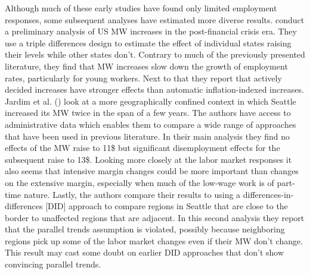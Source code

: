 \documentclass[11pt]{scrartcl}
\begin{document}
Although much of these early studies have found only limited employment responses, some subsequent analyses have estimated more diverse results. \textcite{StrainMW2017} conduct a preliminary analysis of US MW increases in the post-financial crisis era. They use a triple differences design to estimate the effect of individual states raising their levels while other states don't. Contrary to much of the previously presented literature, they find that MW increases slow down the growth of employment rates, particularly for young workers. Next to that they report that actively decided increases have stronger effects than automatic inflation-indexed increases. Jardim et al. (\citeyear{JardimMWSeattle2017}) look at a more geographically confined context in which Seattle increased its MW twice in the span of a few years. The authors have access to administrative data which enables them to compare a wide range of approaches that have been used in previous literature. In their main analysis they find no effects of the MW raise to 11\$ but significant disemployment effects for the subsequent raise to 13\$. Looking more closely at the labor market responses it also seems that intensive margin changes could be more important than changes on the extensive margin, especially when much of the low-wage work is of part-time nature. Lastly, the authors compare their results to using a differences-in-differences [DID] approach to compare regions in Seattle that are close to the border to unaffected regions that are adjacent. In this second analysis they report that the parallel trends assumption is violated, possibly because neighboring regions pick up some of the labor market changes even if their MW don't change. This result may cast some doubt on earlier DID approaches that don't show convincing parallel trends. \\
\end{document}
